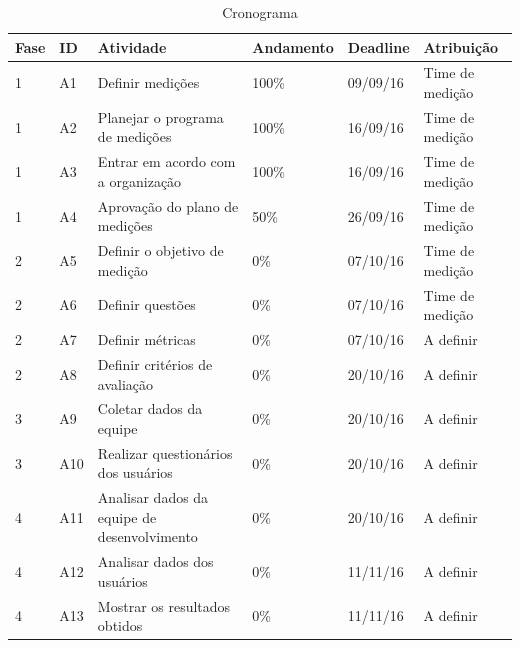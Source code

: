\begin{table}[H]
\centering
\begin{tabular}{|p{1cm}|p{2cm}|p{5cm}|p{3cm}|p{2cm}|p{2cm}|}
\hline
	\textbf{Fase} &
	\textbf{ID} &
	\textbf{Atividade} &
	\textbf{Andamento} &
	\textbf{Deadline} &
	\textbf{Atribuição}
	\\ \hline

1 &
A1 &
Definir medições &
100\% &
09/09/16 &
Time de medição
\\ \hline
1 &
A2 &
Planejar o programa de medições &
100\% &
16/09/16 &
Time de medição
\\ \hline
1 &
A3 &
Entrar em acordo com a organização &
100\% &
16/09/16 &
Time de medição
\\ \hline
1 &
A4 &
Aprovação do plano de medições &
50\% &
26/09/16 &
Time de medição
\\ \hline
2 &
A5 &
Definir o objetivo de medição &
0\% &
07/10/16 &
Time de medição
\\ \hline
2 &
A6 &
Definir questões &
0\% &
07/10/16 &
Time de medição
\\ \hline
2 &
A7 &
Definir métricas &
0\% &
07/10/16 &
A definir
\\ \hline
2 &
A8 &
Definir critérios de avaliação &
0\% &
20/10/16 &
A definir
\\ \hline
3 &
A9 &
Coletar dados da equipe &
0\% &
20/10/16 &
A definir
\\ \hline
3 &
A10 &
Realizar questionários dos usuários &
0\% &
20/10/16 &
A definir
\\ \hline
4 &
A11 &
Analisar dados da equipe de desenvolvimento &
0\% &
20/10/16 &
A definir
\\ \hline
4 &
A12 &
Analisar dados dos usuários &
0\% &
11/11/16 &
A definir
\\ \hline
4 &
A13 &
Mostrar os resultados obtidos &
0\% &
11/11/16 &
A definir

	\\ \hline
\end{tabular}
\caption{Cronograma}
\label{tab:cronograma}
\end{table}
